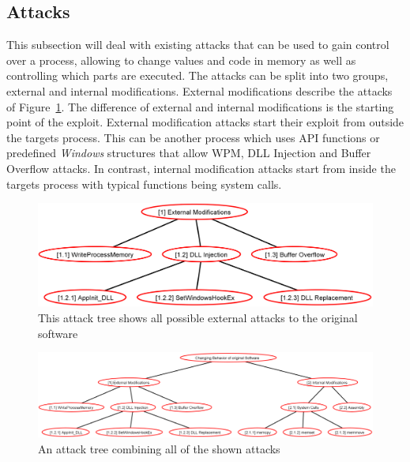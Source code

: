 \subsection{Attacks}
\label{sec:attacks}
This subsection will deal with existing attacks that can be used to gain control over a process, allowing to change values and code in memory as well as controlling which parts are executed. The attacks can be split into two groups, external and internal modifications. External modifications describe the attacks of Figure~\ref{fig:attacks_external}. The difference of external and internal modifications is the starting point of the exploit. External modification attacks start their exploit from outside the targets process. This can be another process which uses \gls{API} functions or predefined \emph{Windows} structures that allow \gls{WPM}, \gls{DLL} Injection and Buffer Overflow attacks. In contrast, internal modification attacks start from inside the targets process with typical functions being system calls.
\begin{figure}[h]
\centering
\includegraphics[width=\textwidth,keepaspectratio]{sections/adtrees/ExternalModificationsWithoutDefenses.png}
\caption{This attack tree shows all possible external attacks to the original software}
\label{fig:attacks_external}
\end{figure}






\begin{figure}[h]
	\centering
	\includegraphics[angle=90,height=\textheight,keepaspectratio]{sections/adtrees/ProcessVirtualMemoryWithoutDefenses.png}
	\caption{An attack tree combining all of the shown attacks}
	\label{fig:attacks}
\end{figure}
